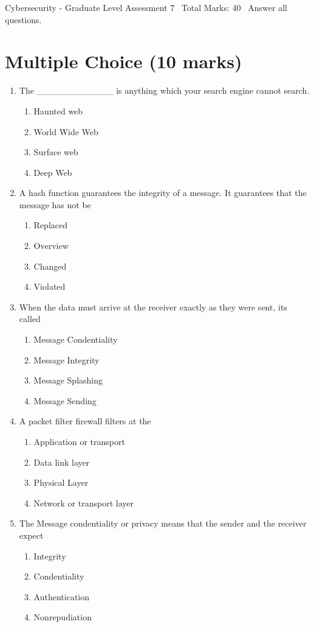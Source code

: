 \documentclass[12pt]{article}
\begin{document}
\begin{center}
Cybersecurity - Graduate Level Assessment 7 \
Total Marks: 40 \
Answer all questions.
\end{center}

\section*{Multiple Choice (10 marks)}
\begin{enumerate}[label=\arabic*.]
\item The \_\_\_\_\_\_\_\_\_\_\_\_ is anything which your search engine cannot search.
\begin{enumerate}[label=(\alph*)]
    \item Haunted web
    \item World Wide Web
    \item Surface web
    \item Deep Web
\end{enumerate}
\item A hash function guarantees the integrity of a message. It guarantees that the message has not be
\begin{enumerate}[label=(\alph*)]
    \item Replaced
    \item Overview
    \item Changed
    \item Violated
\end{enumerate}
\item When the data must arrive at the receiver exactly as they were sent, its called
\begin{enumerate}[label=(\alph*)]
    \item Message Condentiality
    \item Message Integrity
    \item Message Splashing
    \item Message Sending
\end{enumerate}
\item A packet filter firewall filters at the
\begin{enumerate}[label=(\alph*)]
    \item Application or transport
    \item Data link layer
    \item Physical Layer
    \item Network or transport layer
\end{enumerate}
\item The Message condentiality or privacy means that the sender and the receiver expect
\begin{enumerate}[label=(\alph*)]
    \item Integrity
    \item Condentiality
    \item Authentication
    \item Nonrepudiation
\end{enumerate}
\end{enumerate}
\end{document}

